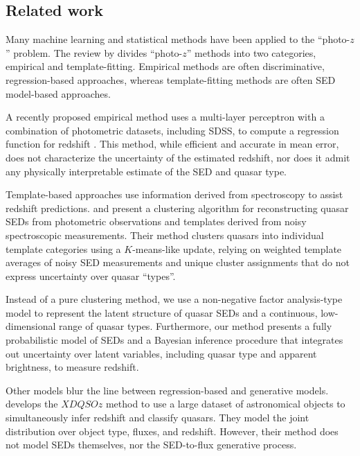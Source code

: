 \documentclass{article} %
\begin{document}
\subsection{Related work}
Many machine learning and statistical methods have been applied to the ``photo-$z$'' problem. The review by \cite{walcher2011fitting} divides ``photo-$z$'' methods into two categories, empirical and template-fitting.  Empirical methods are often discriminative, regression-based approaches, whereas template-fitting methods are often SED model-based approaches.  

A recently proposed empirical method uses a multi-layer perceptron with a combination of photometric datasets, including SDSS, 
to compute a regression function for redshift \cite{brescia2013photometric}. 
This method, while efficient and accurate in mean error, does not characterize the uncertainty of the estimated redshift, nor does it admit any physically interpretable estimate of the SED and quasar type.  

Template-based approaches use information derived from spectroscopy to assist redshift predictions.  
\cite{budavari2001photometric} and \cite{richards2001photometric} present a clustering algorithm for reconstructing quasar SEDs from photometric observations and templates derived from noisy spectroscopic measurements.  
Their method clusters quasars into individual template categories using a $K$-means-like update, relying on weighted template averages of noisy SED measurements and unique cluster assignments that do not express uncertainty over quasar ``types''. 

Instead of a pure clustering method, we use a non-negative factor analysis-type model to represent the latent structure of quasar SEDs and a continuous, low-dimensional range of quasar types.  
Furthermore, our method presents a fully probabilistic model of SEDs and a Bayesian inference procedure that integrates out uncertainty over latent variables, including quasar type and apparent brightness, to measure redshift.    

Other models blur the line between regression-based and generative models.  \citet{bovy2012photometric} develops the $XDQSOz$ method to use a large dataset of astronomical objects to simultaneously infer redshift and classify quasars.  
They model the joint distribution over object type, fluxes, and redshift.  However, their method does not model SEDs themselves, nor the SED-to-flux generative process. 
\end{document}
